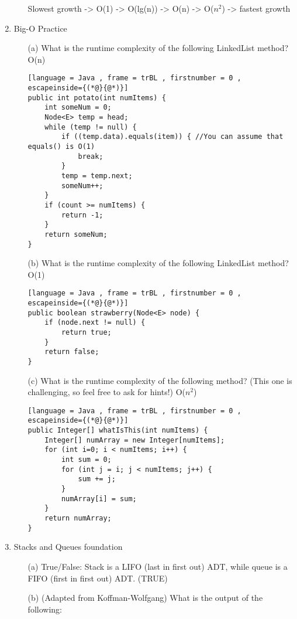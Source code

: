 \documentclass[letter]{article}
\begin{document}
\begin{enumerate}[1.]
\begin{itemize}
    Slowest growth -> O(1) -> O(lg(n)) -> O(n) -> O($n^2$) -> fastest growth

    \end{itemize}

    \newpage
    \item Big-O Practice
    \begin{itemize}
    \item [(a)] What is the runtime complexity of the following LinkedList method? O(n)

    \begin{lstlisting}[language = Java , frame = trBL , firstnumber = 0 , escapeinside={(*@}{@*)}]
public int potato(int numItems) {
    int someNum = 0;
    Node<E> temp = head;
    while (temp != null) {
        if ((temp.data).equals(item)) { //You can assume that equals() is O(1)
            break;
        }
        temp = temp.next;
        someNum++;
    }
    if (count >= numItems) {
        return -1;
    }
    return someNum;
}
    \end{lstlisting}

    \item [(b)] What is the runtime complexity of the following LinkedList method? O(1)

    \begin{lstlisting}[language = Java , frame = trBL , firstnumber = 0 , escapeinside={(*@}{@*)}]
public boolean strawberry(Node<E> node) {
    if (node.next != null) {
        return true;
    }
    return false;
}
    \end{lstlisting}

    \item [(c)] What is the runtime complexity of the following method? (This one is challenging, so feel free to ask for hints!) O($n^2$)

    \begin{lstlisting}[language = Java , frame = trBL , firstnumber = 0 , escapeinside={(*@}{@*)}]
public Integer[] whatIsThis(int numItems) {
    Integer[] numArray = new Integer[numItems];
    for (int i=0; i < numItems; i++) {
        int sum = 0;
        for (int j = i; j < numItems; j++) {
            sum += j;
        }
        numArray[i] = sum;
    }
    return numArray;
}
    \end{lstlisting}
    \end{itemize}
\newpage
    \item Stacks and Queues foundation
    \begin{itemize}
        \item [(a)] True/False: Stack is a LIFO (last in first out) ADT, while queue is a FIFO (first in first out) ADT. (TRUE)
        \item [(b)] (Adapted from Koffman-Wolfgang) What is the output of the following:


\end{itemize}
\end{enumerate}
\end{document}
